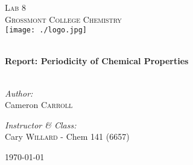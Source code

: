 \begin{titlepage}
\begin{center}

\textsc{\Large Lab 8}\\[1.5cm]
\textsc{\Large Grossmont College Chemistry}\\[0.5cm]
\texttt{[image: ./logo.jpg]}

\HRule \\[0.4cm]
{ \LARGE \bfseries Report: Periodicity of Chemical Properties}\\[0.5cm]

\HRule \\[1.5cm]

\begin{minipage}{0.4\textwidth}
\begin{flushleft} \large
\emph{Author:}\\
Cameron \textsc{Carroll}\\[0.2cm]

\end{flushleft}
\end{minipage}
\begin{minipage}{0.4\textwidth}
\begin{flushright} \large
\emph{Instructor \& Class:}\\
Cary \textsc{Willard} - Chem 141 (6657)
\end{flushright}
\end{minipage}

\vfill

{\large \today}

\end{center}
\end{titlepage}
